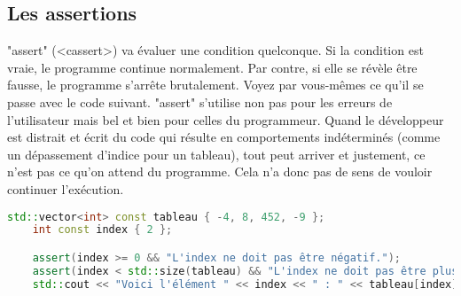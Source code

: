 \documentclass{article}
\begin{document}
\subsection{Les assertions}
"assert" (<cassert>) va évaluer une condition quelconque. Si la condition est vraie, le programme continue normalement. Par contre, si elle se révèle être fausse, le programme s’arrête brutalement. Voyez par vous-mêmes ce qu’il se passe avec le code suivant.
"assert" s’utilise non pas pour les erreurs de l’utilisateur mais bel et bien pour celles du programmeur. Quand le développeur est distrait et écrit du code qui résulte en comportements indéterminés (comme un dépassement d’indice pour un tableau), tout peut arriver et justement, ce n’est pas ce qu’on attend du programme. Cela n’a donc pas de sens de vouloir continuer l’exécution.

\begin{lstlisting}[language=C++]
    std::vector<int> const tableau { -4, 8, 452, -9 };
    int const index { 2 };

    assert(index >= 0 && "L'index ne doit pas être négatif.");
    assert(index < std::size(tableau) && "L'index ne doit pas être plus grand que la taille du tableau.");
    std::cout << "Voici l'élément " << index << " : " << tableau[index] << std::endl;
\end{lstlisting}{}
\end{document}
